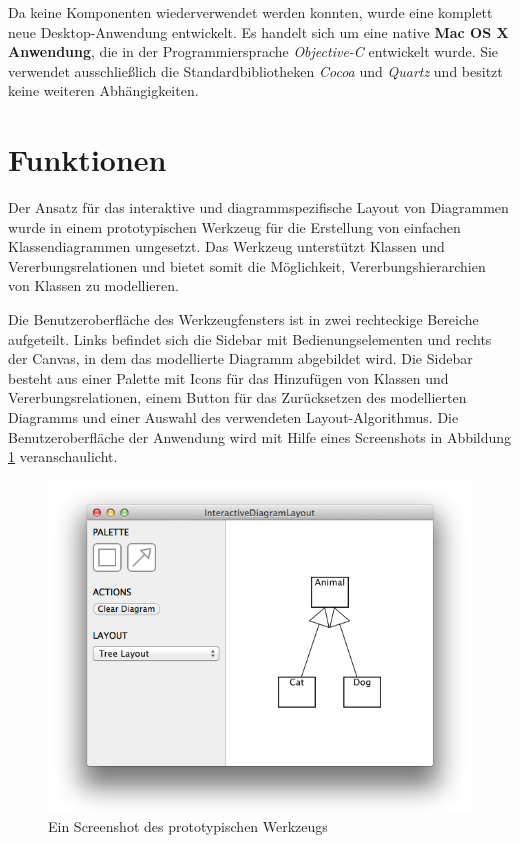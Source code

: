 Da keine Komponenten wiederverwendet werden konnten, wurde eine komplett neue Desktop-Anwendung entwickelt. Es handelt sich um eine native \textbf{Mac OS X Anwendung}, die in der Programmiersprache \textit{Objective-C} entwickelt wurde. Sie verwendet ausschließlich die Standardbibliotheken \textit{Cocoa} und \textit{Quartz} und besitzt keine weiteren Abhängigkeiten.

\section{Funktionen}
\label{sec:functions}

Der Ansatz für das interaktive und diagrammspezifische Layout von Diagrammen wurde in einem prototypischen Werkzeug für die Erstellung von einfachen Klassendiagrammen umgesetzt. Das Werkzeug unterstützt Klassen und Vererbungsrelationen und bietet somit die Möglichkeit, Vererbungshierarchien von Klassen zu modellieren.

Die Benutzeroberfläche des Werkzeugfensters ist in zwei rechteckige Bereiche aufgeteilt. Links befindet sich die Sidebar mit Bedienungselementen und rechts der Canvas, in dem das modellierte Diagramm abgebildet wird. Die Sidebar besteht aus einer Palette mit Icons für das Hinzufügen von Klassen und Vererbungsrelationen, einem Button für das Zurücksetzen des modellierten Diagramms und einer Auswahl des verwendeten Layout-Algorithmus. Die Benutzeroberfläche der Anwendung wird mit Hilfe eines Screenshots in Abbildung \ref{fig:prototype-screenshot} veranschaulicht.

\begin{figure}[hbt]
    \centering
    \includegraphics[scale=0.6]{resources/prototype-screenshot}
    \caption{Ein Screenshot des prototypischen Werkzeugs}
    \label{fig:prototype-screenshot}
\end{figure}

